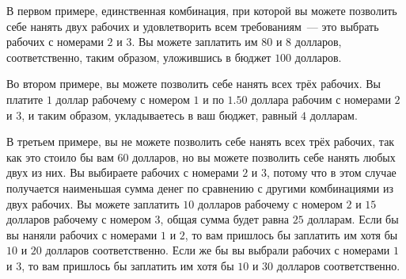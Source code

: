 В первом примере, единственная комбинация, при которой вы можете позволить себе нанять двух рабочих и удовлетворить всем требованиям~--- это выбрать рабочих с номерами $2$ и $3$. Вы можете заплатить им $80$ и $8$ долларов, соответственно, таким образом, уложившись в бюджет $100$ долларов.

Во втором примере, вы можете позволить себе нанять всех трёх рабочих. Вы платите $1$ доллар
рабочему с номером $1$ и по $1.50$ доллара рабочим с номерами $2$ и $3$, и таким образом,
укладываетесь в ваш бюджет, равный $4$ долларам.

В третьем примере, вы не можете позволить себе нанять всех трёх рабочих, так как это стоило бы вам $60$ долларов, но вы можете позволить себе нанять любых двух из них. Вы выбираете рабочих с номерами $2$ и $3$, потому что в этом случае получается наименьшая сумма денег по сравнению с другими комбинациями из двух рабочих. Вы можете заплатить $10$ долларов рабочему с номером $2$ и $15$ долларов рабочему с номером $3$, общая сумма будет равна $25$ долларам. Если бы вы наняли рабочих с номерами $1$ и $2$, то вам пришлось бы заплатить им хотя бы $10$ и $20$ долларов соответственно. Если же бы вы выбрали рабочих с номерами $1$ и $3$, то вам пришлось бы заплатить им хотя бы $10$ и $30$ долларов соответственно.